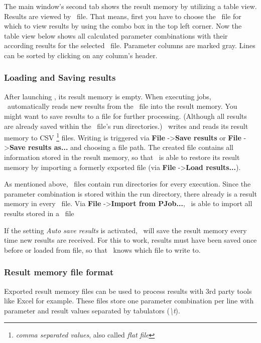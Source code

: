 The main window's second tab shows the result memory by utilizing a table view.
Results are viewed by \PJOB\ file.
That means, first you have to choose the \PJOB\ file for which to view results
by using the combo box in the top left corner.
Now the table view below shows all calculated parameter combinations with their according results
for the selected \PJOB\ file.
Parameter columns are marked gray.
Lines can be sorted by clicking on any column's header.

\subsubsection{Loading and Saving results}
After launching \PQUEUE, its result memory is empty.
When executing jobs,
\PQUEUE\ automatically reads new results from the \PJOB\ file into the result memory.
You might want to save results to a file for further processing.
(Although all results are already saved within the \PJOB\ file's run directories.)
\PQUEUE\ writes and reads its result memory to CSV \footnote{\textit{comma separated values}, also called \textit{flat file}} files.
Writing is triggered via \textbf{File} -\textgreater \textbf{Save results} or \textbf{File} -\textgreater \textbf{Save results as...} and choosing a file path.
The created file contains all information stored in the result memory,
so that \PQUEUE\ is able to restore its result memory by importing a formerly exported file
(via \textbf{File} -\textgreater \textbf{Load results...}).

As mentioned above,
\PJOB\ files contain run directories for every execution.
Since the parameter combination is stored within the run directory,
there already is a result memory in every \PJOB\ file.
Via \textbf{File} -\textgreater \textbf{Import from PJob...},
\PQUEUE\ is able to import all results stored in a \PJOB\ file

If the setting \textit{Auto save results} is activated,
\PQUEUE\ will save the result memory every time new results are received.
For this to work, results must have been saved once before or loaded from file,
so that \PQUEUE\ knows which file to write to.


\subsubsection{Result memory file format}
Exported result memory files can be used to process results with 3rd party tools like Excel for example.
These files store one parameter combination per line with parameter and result values separated by tabulators (\textit{\textbackslash t}).

